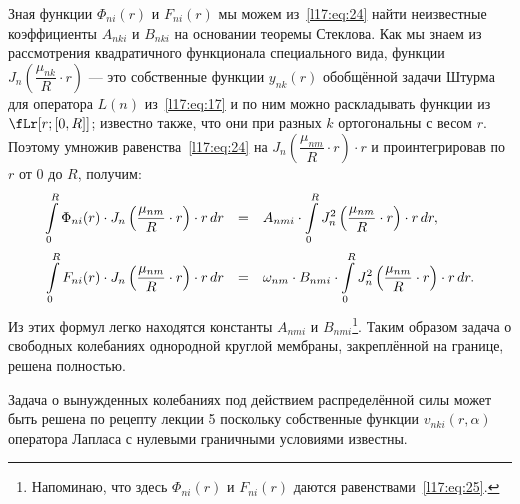 Зная функции $\Phi_{ni}(r)$ и $F_{ni}(r)$ мы можем из~\eqref{l17:eq:24} найти неизвестные коэффициенты $A_{nki}$ и $B_{nki}$ на основании теоремы Стеклова. Как мы знаем из рассмотрения квадратичного функционала специального вида, функции $J_n\left(\dfrac{\mu_{nk}}{R}\cdot r\right)$ --- это собственные функции $y_{nk}(r)$ обобщённой задачи Штурма для оператора $L(n)$ из~\eqref{l17:eq:17} и по ним можно раскладывать функции из $\fLr[r;{[0,R]}]$; известно также, что они при разных $k$ ортогональны с весом $r$. Поэтому умножив равенства~\eqref{l17:eq:24} на $J_n\left(\dfrac{\mu_{nm}}{R}\cdot r\right)\cdot r$ и проинтегрировав по $r$ от $0$ до $R$, получим:
\begin{equation*}
	\hfill\begin{array}{rcl}
		\displaystyle\int\limits_{0}^{R}\Phi_{ni}(r)\cdot J_{n}\left(\frac{\mu_{nm}}{R}\cdot r\right)\cdot r\,dr&=&\displaystyle A_{nmi}\cdot\int\limits_{0}^{R}J_{n}^2\left(\frac{\mu_{nm}}{R}\cdot r\right)\cdot r\,dr,\\[18pt]
		\displaystyle \int\limits_{0}^{R}F_{ni}(r)\cdot J_{n}\left(\frac{\mu_{nm}}{R}\cdot r\right)\cdot r\,dr&=&\displaystyle\omega_{nm}\cdot B_{nmi}\cdot\int\limits_{0}^{R}J_{n}^2\left(\frac{\mu_{nm}}{R}\cdot r\right)\cdot r\,dr.
	\end{array}\hfill
\end{equation*} 
Из этих формул легко находятся константы $A_{nmi}$ и $B_{nmi}$\footnote{Напоминаю, что здесь $\Phi_{ni}(r)$ и $F_{ni}(r)$ даются равенствами~\eqref{l17:eq:25}.}. Таким образом задача о свободных колебаниях однородной круглой мембраны, закреплённой на границе, решена полностью.

Задача о вынужденных колебаниях под действием распределённой силы может быть решена по рецепту лекции 5 поскольку собственные функции $v_{nki}(r,\alpha)$ оператора Лапласа с нулевыми граничными условиями известны.

